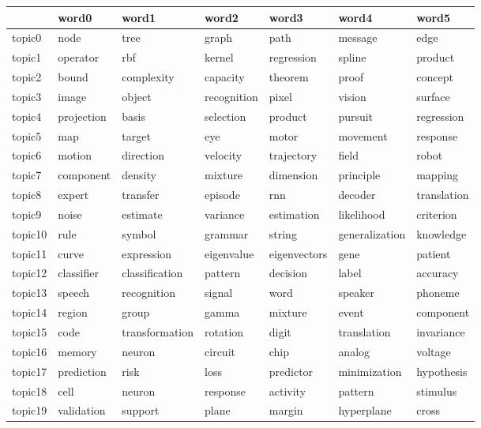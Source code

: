 \documentclass[letterpaper]{article}
\begin{document}
\begin{figure}[ht]
  \centering
  \begin{tabular}{l | l l l l l l}
    &     word0    &      word1 &          word2 &         word3 & word4 &        word5 \\ \hline
    topic0 & 	node & 	tree & 	graph & 	path & 	message & 	edge \\
    topic1 & 	operator & 	rbf & 	kernel & 	regression & 	spline & 	product \\
    topic2 & 	bound & 	complexity & 	capacity & 	theorem & 	proof & 	concept \\
    topic3 & 	image & 	object & 	recognition & 	pixel & 	vision & 	surface \\
    topic4 & 	projection & 	basis & 	selection & 	product & 	pursuit & 	regression \\
    topic5 & 	map & 	target & 	eye & 	motor & 	movement & 	response \\
    topic6 & 	motion & 	direction & 	velocity & 	trajectory & 	field & 	robot \\
    topic7 & 	component & 	density & 	mixture & 	dimension & 	principle & 	mapping \\
    topic8 & 	expert & 	transfer & 	episode & 	rnn & 	decoder & 	translation \\
    topic9 & 	noise & 	estimate & 	variance & 	estimation & 	likelihood & 	criterion \\
    topic10 & 	rule & 	symbol & 	grammar & 	string & 	generalization & 	knowledge \\
    topic11 & 	curve & 	expression & 	eigenvalue & 	eigenvectors & 	gene & 	patient \\
    topic12 & 	classifier & 	classification & 	pattern & 	decision & 	label & 	accuracy \\
    topic13 & 	speech & 	recognition & 	signal & 	word & 	speaker & 	phoneme \\
    topic14 & 	region & 	group & 	gamma & 	mixture & 	event & 	component \\
    topic15 & 	code & 	transformation & 	rotation & 	digit & 	translation & 	invariance \\
    topic16 & 	memory & 	neuron & 	circuit & 	chip & 	analog & 	voltage \\
    topic17 & 	prediction & 	risk & 	loss & 	predictor & 	minimization & 	hypothesis \\
    topic18 & 	cell & 	neuron & 	response & 	activity & 	pattern & 	stimulus \\
    topic19 & 	validation & 	support & 	plane & 	margin & 	hyperplane & 	cross \\

\end{tabular}
\end{figure}
\end{document}
